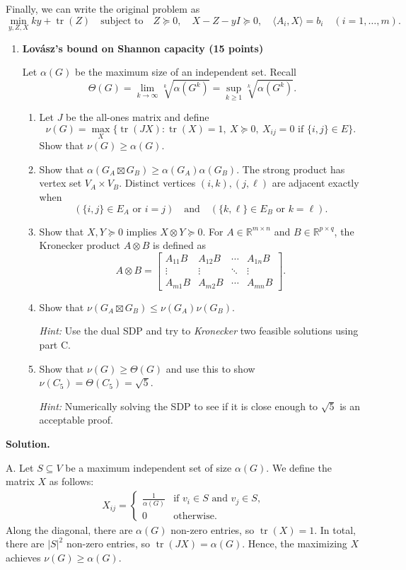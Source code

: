 \documentclass[11pt,letterpaper]{article}
\theoremstyle{definition}
\newcommand{\reals}{\mathbb{R}}
\newcommand{\tr}{\operatorname{tr}}
\newcommand{\solution}{\medskip\noindent\textbf{Solution.}\par\medskip}
\begin{document}
Finally, we can write the original problem as
\[
\min_{y,Z,X}  ky + \tr(Z) \quad \text{subject to} \quad Z\succeq 0, \quad X-Z-yI \succeq 0, \quad \langle A_i, X \rangle = b_i \quad (i = 1, \ldots, m).  
\]

\begin{enumerate}[resume=q]
\item \textbf{Lov\'asz's bound on Shannon capacity (15 points)}

Let $\alpha(G)$ be the maximum size of an independent set. Recall
\[
\Theta(G) = \lim_{k \to \infty} \sqrt[k]{\alpha(G^k)} = \sup_{k \geq 1} \sqrt[k]{\alpha(G^k)}.
\]
\begin{enumerate}[label=\textbf{Part \Alph*.}, leftmargin=*]
\item Let $J$ be the all-ones matrix and define
\[
\nu(G) = \max_X \bigl\{\operatorname{tr}(JX) : \operatorname{tr}(X) = 1,\ X \succeq 0,\ X_{ij} = 0 \text{ if } \{i, j\} \in E\bigr\}.
\]
Show that $\nu(G) \geq \alpha(G)$.
\item Show that $\alpha(G_A \boxtimes G_B) \geq \alpha(G_A)\alpha(G_B)$. The strong product has vertex set $V_A \times V_B$. Distinct vertices $(i, k), (j, \ell)$ are adjacent exactly when
\[
(\{i, j\} \in E_A \text{ or } i = j) \quad \text{and} \quad (\{k, \ell\} \in E_B \text{ or } k = \ell).
\]
\item Show that $X, Y \succeq 0$ implies $X \otimes Y \succeq 0$. For $A \in \reals^{m \times n}$ and $B \in \reals^{p \times q}$, the Kronecker product $A \otimes B$ is defined as
\[
A \otimes B = \begin{bmatrix}
A_{11}B & A_{12}B & \cdots & A_{1n}B \\
\vdots & \vdots & \ddots & \vdots \\
A_{m1}B & A_{m2}B & \cdots & A_{mn}B
\end{bmatrix}.
\]
\item Show that $\nu(G_A \boxtimes G_B) \leq \nu(G_A)\nu(G_B)$.

\emph{Hint:} Use the dual SDP and try to \emph{Kronecker} two feasible solutions using part C.
\item Show that $\nu(G) \geq \Theta(G)$ and use this to show $\nu(C_5) = \Theta(C_5) = \sqrt{5}$.

\emph{Hint:} Numerically solving the SDP to see if it is close enough to $\sqrt{5}$ is an acceptable proof.
\end{enumerate}
\end{enumerate}

\solution
A.
Let $S\subseteq V$ be a maximum independent set of size $\alpha(G)$.
We define the matrix $X$ as follows:
\begin{align*}
    X_{ij} = \begin{cases}
        \frac{1}{\alpha(G)} &\text{if }v_i\in S \text{ and }v_j\in S,\\
        0 &\text{otherwise.}
    \end{cases}
\end{align*}
Along the diagonal, there are $\alpha(G)$ non-zero entries, so $\tr(X)=1$.
In total, there are $|S|^2$ non-zero entries, so $\tr(JX) = \alpha(G)$.
Hence, the maximizing $X$ achieves $\nu(G)\geq \alpha(G)$.
\end{document}
